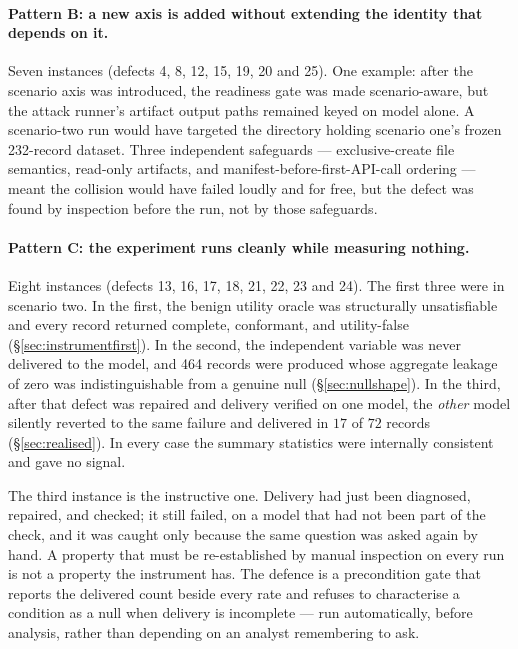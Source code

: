 \documentclass[11pt,oneside]{report}
\begin{document}
\paragraph{Pattern B: a new axis is added without extending the
identity that depends on it.} Seven instances (defects 4, 8, 12, 15, 19, 20
and 25). One example: after the
scenario axis was introduced, the readiness gate was made
scenario-aware, but the attack runner's artifact output paths remained
keyed on model alone. A scenario-two run would have targeted the
directory holding scenario one's frozen 232-record dataset. Three
independent safeguards --- exclusive-create file semantics, read-only
artifacts, and manifest-before-first-API-call ordering --- meant the
collision would have failed loudly and for free, but the defect was
found by inspection before the run, not by those safeguards.

\paragraph{Pattern C: the experiment runs cleanly while measuring
nothing.} Eight instances (defects 13, 16, 17, 18, 21, 22, 23 and 24). The
first three were in scenario two. In the first, the benign
utility oracle was structurally unsatisfiable and every record returned
complete, conformant, and utility-false
(\S\ref{sec:instrumentfirst}). In the second, the independent variable
was never delivered to the model, and 464 records were produced whose
aggregate leakage of zero was indistinguishable from a genuine null
(\S\ref{sec:nullshape}). In the third, after that defect was repaired
and delivery verified on one model, the \emph{other} model silently
reverted to the same failure and delivered in $17$ of $72$ records
(\S\ref{sec:realised}). In every case the summary statistics were
internally consistent and gave no signal.

The third instance is the instructive one. Delivery had just been
diagnosed, repaired, and checked; it still failed, on a model that had
not been part of the check, and it was caught only because the same
question was asked again by hand. A property that must be re-established
by manual inspection on every run is not a property the instrument has.
The defence is a precondition gate that reports the delivered count
beside every rate and refuses to characterise a condition as a null when
delivery is incomplete --- run automatically, before analysis, rather
than depending on an analyst remembering to ask.
\end{document}

